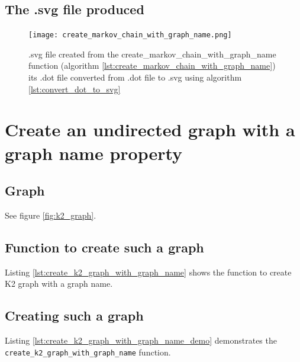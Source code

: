 \subsection{The .svg file produced}

\begin{figure}[!htbp]
  \texttt{[image: create\_markov\_chain\_with\_graph\_name.png]}
  \caption{
    .svg file created from the create\_markov\_chain\_with\_graph\_name function 
    (algorithm \ref{lst:create_markov_chain_with_graph_name}) 
    its .dot file converted from .dot file to .svg 
    using algorithm \ref{lst:convert_dot_to_svg}
  }
  \label{fig:create_markov_chain_with_graph_name.svg}
\end{figure}

\section{Create an undirected graph with a graph name property}
\label{subsec:create_k2_graph_with_graph_name}

\subsection{Graph}

See figure \ref{fig:k2_graph}.

\subsection{Function to create such a graph}

Listing \ref{lst:create_k2_graph_with_graph_name}
shows the function to create K2 graph with a graph name.



\subsection{Creating such a graph}

Listing \ref{lst:create_k2_graph_with_graph_name_demo}
demonstrates the \verb;create_k2_graph_with_graph_name; function.



